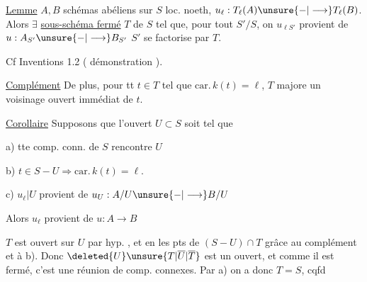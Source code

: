 \uline{Lemme} $A,B$ schémas abéliens sur $S$ loc. noeth, $u_\ell:T_\ell(A)\unsure{-|\longrightarrow}T_\ell(B)$. Alors $\exists$ \uline{sous-schéma fermé} $T$ de $S$ tel que, pour tout $S'/S$, on  $u_{\ell S'}$ provient de $u:A_{S'}\unsure{-|\longrightarrow}B_{S'}$  $S'$ se factorise par $T$.

Cf Inventions 1.2 ( démonstration ).


\uline{Complément} De plus,  pour tt $t\in T$ tel que $\mathrm{car.}\,k(t)=\ell$, $T$ majore un voisinage ouvert immédiat de $t$.

\uline{Corollaire} Supposons que l'ouvert $U\subset S$ soit tel que

a) tte comp. conn. de $S$ rencontre $U$

b) $t\in S-U\Longrightarrow\mathrm{car.}\,k(t)=\ell$.

c) $u_\ell|U$ provient de $u_U:A/U\unsure{-|\longrightarrow}B/U$

Alors  $u_\ell$ provient de $u:A\longrightarrow B$

 $T$ est ouvert  sur $U$ par hyp. , et en les pts de $(S-U)\cap T$ grâce au complément et à b). Donc $\deleted{U}\unsure{T|\overline U|\overline T}$ est un  ouvert, et comme il est fermé, c'est une réunion de comp. connexes. Par a) on a donc $T=S$, cqfd

